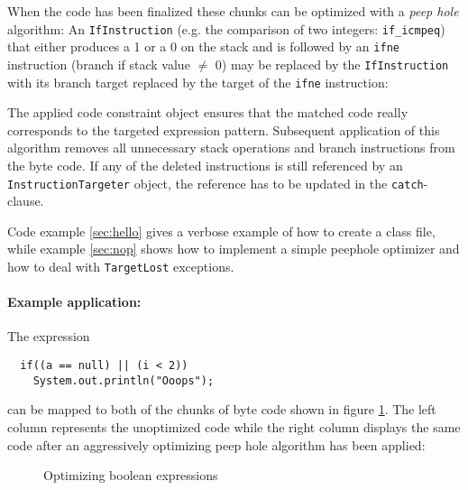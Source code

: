 \documentclass[12pt,twoside]{article}
\begin{document}
When the code has been finalized  these chunks can be optimized with a
\emph{peep  hole}  algorithm:  An  \texttt{IfInstruction}  (e.g.   the
comparison of two  integers: \texttt{if\_icmpeq}) that either produces
a  1  or  a 0  on  the  stack  and  is  followed by  an  \texttt{ifne}
instruction (branch  if stack value $\neq$  0) may be  replaced by the
\texttt{IfInstruction} with  its branch target replaced  by the target
of  the  \texttt{ifne}  instruction:

{\small {}}

The  applied code  constraint  object ensures  that  the matched  code
really  corresponds to  the targeted  expression  pattern.  Subsequent
application of this algorithm removes all unnecessary stack operations
and  branch instructions from  the byte  code. If  any of  the deleted
instructions  is still  referenced by  an \texttt{InstructionTargeter}
object, the reference has to be updated in the \texttt{catch}-clause.

Code example \ref{sec:hello} gives a  verbose example of how to create
a class  file, while  example \ref{sec:nop} shows  how to  implement a
simple  peephole optimizer  and how  to deal  with \texttt{TargetLost}
exceptions.

\paragraph{Example application:}
The expression

\begin{verbatim}
  if((a == null) || (i < 2))
    System.out.println("Ooops");
\end{verbatim}

can be mapped to both of the chunks of byte code shown in figure
\ref{fig:code}. The left column represents the unoptimized code while
the right column displays the same code after an aggressively
optimizing peep hole algorithm has been applied:

\begin{figure}[hpt]
\begin{minipage}{0.49\textwidth}
  {\small {}} \vfil
\end{minipage}
\begin{minipage}{0.49\textwidth}
  {\small {}} \vfil
\end{minipage}\label{fig:code}\caption{Optimizing boolean expressions}
\begin{center}

  
\end{center}
\end{figure}
\end{document}
